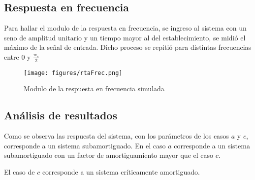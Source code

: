 \documentclass[../../guia1.tex]{subfiles}
\begin{document}
\subsection{Respuesta en frecuencia}
Para hallar el modulo de la respuesta en frecuencia, se ingreso al sistema con un seno de amplitud unitario y un tiempo mayor al del establecimiento, se midió el máximo de la se\~nal de entrada. Dicho proceso se repitió para distintas frecuencias entre 0 y $\frac{w_s}{2} $

\begin{figure}[H]
  \centering
   \texttt{[image: figures/rtaFrec.png]}
  \caption{Modulo de la respuesta en frecuencia simulada}
  \label{fig:rtaFrecFin}
\end{figure}
\subsection{Análisis de resultados}
Como se observa las respuesta del sistema, con los parámetros de los casos $a$ y $c$, corresponde a un sistema subamortiguado. En el caso $a$ corresponde a un sistema subamortiguado con un factor de amortiguamiento mayor que el caso $c$.
\par El caso de $c$ corresponde a un sistema críticamente amortiguado.
\end{document}
